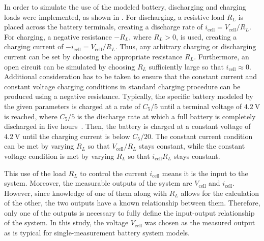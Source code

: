 \documentclass[../zhang_thesis.tex]{subfiles}
\begin{document}
In order to simulate the use of the modeled battery, discharging and charging loads were implemented, as shown in . For discharging, a resistive load $R_L$ is placed across the battery terminals, creating a discharge rate of $i_\text{cell}=V_\text{cell}/R_L$. For charging, a negative resistance $-R_L$, where $R_L>0$, is used, creating a charging current of $-i_\text{cell}=V_\text{cell}/R_L$. Thus, any arbitrary charging or discharging current can be set by
choosing the appropriate resistance $R_L$. Furthermore, an open circuit can be simulated by choosing $R_L$ sufficiently large so that $i_\text{cell}\approx 0$. Additional consideration has to be taken to ensure that the constant current and constant voltage charging conditions in standard charging procedure can be produced using a negative resistance. Typically, the specific battery modeled by the given parameters is charged at a rate of $C_5/5$ until a terminal voltage of
$4.2~\textrm{V}$ is reached, where $C_5/5$ is the discharge rate at which a full battery is completely discharged in five hours~\cite{linden01_ch3}. Then, the battery is charged at a constant voltage of $4.2~\textrm{V}$ until the charging current is below $C_5/20$. The constant current condition can be met by varying $R_L$ so that $V_\text{cell}/R_L$ stays constant, while the constant voltage condition is met by varying $R_L$ so that $i_\text{cell} R_L$ stays constant.

This use of the load $R_L$ to control the current $i_\text{cell}$ means it is the input to the system. Moreover, the measurable outputs of the system are $V_\text{cell}$ and $i_\text{cell}$. However, since knowledge of one of them along with $R_L$ allows for the calculation of the other, the two outputs have a known relationship between them. Therefore, only one of the outputs is necessary to fully define the input-output relationship of the system. In this study, the voltage
$V_\text{cell}$ was chosen as the measured output as is typical for single-measurement battery system models.
\end{document}
